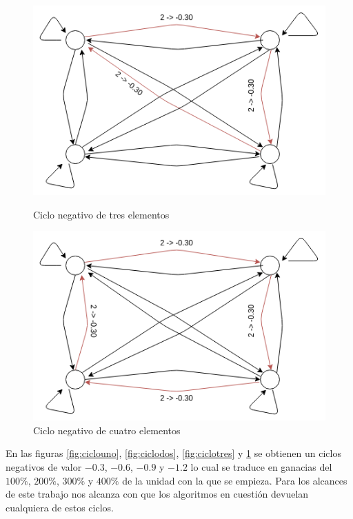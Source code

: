 \begin{figure}[H] 
    \centering
    \begin{minipage}{0.45\textwidth}
        \centering
        \includegraphics[width=1\textwidth]{img/ccctriple.png} %
        \caption{Ciclo negativo de tres elementos}
        \label{fig:ciclotres}
    \end{minipage}\hfill
    \begin{minipage}{0.45\textwidth}
        \centering
        \includegraphics[width=1\textwidth]{img/ccciclocuatro.png} %
        \caption{Ciclo negativo de cuatro elementos}
        \label{fig:ciclocuatro}
    \end{minipage}\hfill
\end{figure}

En las figuras \ref{fig:ciclouno}, \ref{fig:ciclodos}, \ref{fig:ciclotres} y \ref{fig:ciclocuatro} se obtienen un ciclos
negativos de valor $-0.3$, $-0.6$, $-0.9$ y $-1.2$ lo cual se traduce en ganacias del $100\%$, $200\%$, $300\%$ y $400\%$
de la unidad con la que se empieza. Para los alcances de este trabajo nos alcanza con que los algoritmos en cuesti\'on
devuelan cualquiera de estos ciclos.

